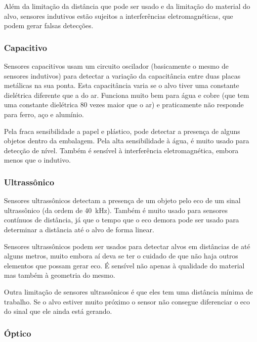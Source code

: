 Além da limitação da distância que pode ser usado e da limitação do material do alvo, sensores indutivos estão sujeitos a interferências eletromagnéticas, que podem gerar falsas detecções.

\subsubsection{Capacitivo}
\label{subs:Capacitivo}

Sensores capacitivos usam um circuito oscilador (basicamente o mesmo de sensores indutivos) para detectar a variação da capacitância entre duas placas metálicas na sua ponta. Esta capacitância varia se o alvo tiver uma constante dielétrica diferente que a do ar. Funciona muito bem para água e cobre (que tem uma constante dielétrica 80 vezes maior que o ar) e praticamente não responde para ferro, aço e alumínio.

Pela fraca sensibilidade a papel e plástico, pode detectar a presença de alguns objetos dentro da embalagem. Pela alta sensibilidade à água, é muito usado para detecção de nível. Também é sensível à interferência eletromagnética, embora menos que o indutivo.

\subsubsection{Ultrassônico}
\label{subs:Ultrassonico}

Sensores ultrassônicos detectam a presença de um objeto pelo eco de um sinal ultrassônico (da ordem de \SI{40}{kHz}). Também é muito usado para sensores contínuos de distância, já que o tempo que o eco demora pode ser usado para determinar a distância até o alvo de forma linear.

Sensores ultrassônicos podem ser usados para detectar alvos em distâncias de até alguns metros, muito embora aí deva se ter o cuidado de que não haja outros elementos que possam gerar eco. É sensível não apenas à qualidade do material mas também à geometria do mesmo.

Outra limitação de sensores ultrassônicos é que eles tem uma distância mínima de trabalho. Se o alvo estiver muito próximo o sensor não consegue diferenciar o eco do sinal que ele ainda está gerando.

\subsubsection{Óptico}
\label{subs:optico}

